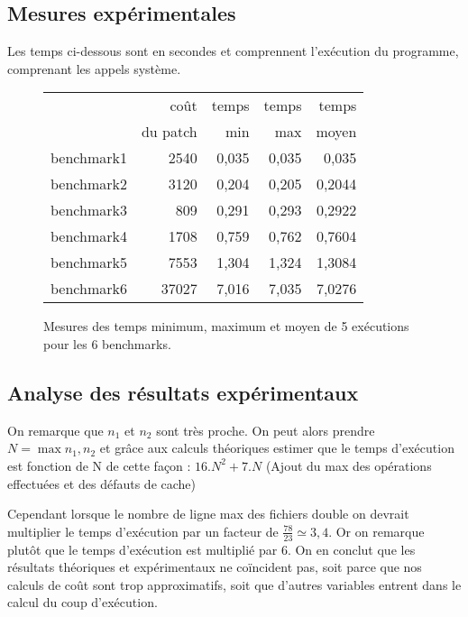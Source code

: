 \documentclass[a4paper, 10pt, french]{article}
\begin{document}
  \subsection{Mesures expérimentales}
    Les temps ci-dessous sont en secondes et comprennent l'exécution du programme, comprenant les appels système.

    \begin{figure}[h]
      \begin{center}
        \begin{tabular}{|l||r||r|r|r||}
          \hline
          \hline
            & coût         & temps     & temps   & temps \\
            & du patch     & min       & max     & moyen \\
          \hline
          \hline
            benchmark1 &   2540   & 0,035  &  0,035  &  0,035 \\
          \hline
            benchmark2 &   3120   & 0,204  &  0,205  &  0,2044 \\
          \hline
            benchmark3 &   809   &  0,291  &  0,293  &  0,2922 \\
          \hline
            benchmark4 &   1708  & 0,759  &  0,762  &  0,7604 \\
          \hline
            benchmark5 &   7553   & 1,304  &  1,324  &  1,3084 \\
          \hline
            benchmark6 &   37027  & 7,016  &  7,035  &  7,0276  \\
          \hline
          \hline
        \end{tabular}
        \caption{Mesures des temps minimum, maximum et moyen de 5 exécutions pour les 6 benchmarks.}
        \label{table-temps}
      \end{center}
    \end{figure}

\subsection{Analyse des résultats expérimentaux}
On remarque que $n_1$ et $n_2$ sont très proche. On peut alors prendre $N = \max{n_1, n_2}$ et grâce aux calculs théoriques estimer que le temps d'exécution est fonction de N de cette façon : $16.N^2 +7.N$  (Ajout du max des opérations effectuées et des défauts de cache)

Cependant lorsque le nombre de ligne max des fichiers double on devrait multiplier le temps d'exécution par un facteur de $\frac{78}{23} \simeq 3,4$. Or on remarque plutôt que le temps d'exécution est multiplié par 6. On en conclut que les résultats théoriques et expérimentaux ne coïncident pas, soit parce que nos calculs de coût sont trop approximatifs, soit que d'autres variables entrent dans le calcul du coup d'exécution.
\end{document}
